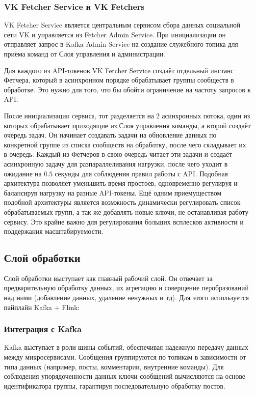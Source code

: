         \subsubsection{VK Fetcher Service и VK Fetchers}
            VK Fetcher Service является центральным сервисом сбора данных социальной сети VK и управляется из Fetcher Admin Service. При инициализации он отправляет запрос в Kafka Admin Service на создание служебного топика для приёма команд от Слоя управления и администрации.

            Для каждого из API-токенов VK Fetcher Service создаёт отдельный инстанс Фетчера, который в асинхронном порядке обрабатывает группы сообществ в обработке. Это нужно для того, что бы обойти ограничение на частоту запросов к API.

            После инициализации сервиса, тот разделяется на 2 асинхронных потока, один из которых обрабатывает приходящие из Слоя управления команды, а второй создаёт очередь задач. Он начинает создавать задачи на обновление данных по конкретной группе из списка сообществ на обработку, после чего складывает их в очередь. Каждый из Фетчеров в свою очередь читает эти задачи и создаёт асинхронную задачу для разпараллеливания нагрузки, после чего уходит в ожидание на $0.5$ секунды для соблюдения правил работы с API. Подобная архитектура позволяет уменьшить время простоев, одновременно регулируя и балансируя нагрузку на разные API-токены. Ещё одним приемуществом подобной архитектуры является возмжность динамически регулировать список обрабатываемых групп, а так же добавлять новые ключи, не останавливая работу сервису. Это крайне важно для регулирования больших всплесков активности и поддержания масштабируемости.

    \subsection{Слой обработки}
        Слой обработки выступает как главный рабочий слой. Он отвечает за предварительную обработку данных, их агрегацию и соверщение перобразований над ними (добавление данных, удаление ненужных и тд). Для этого используется пайплайн Kafka + Flink:             

        \subsubsection{Интеграция с Kafka}
            Kafka выступает в роли шины событий, обеспечивая надежную передачу данных между микросервисами. Сообщения группируются по топикам в зависимости от типа данных (например, посты, комментарии, внутренние команды). Для соблюдения упорядоченности данных ключи сообщений вычисляются на основе идентификатора группы, гарантируя последовательную обработку постов. 
            
